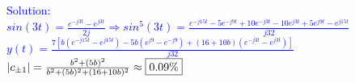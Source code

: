 \documentclass[12pt,a4paper]{article}
\begin{document}
\begin{tcolorbox}
\normalsize
\textcolor{blue}{Solution:\\
$sin(3t)=\frac{e^{-j3t}-e^{j3t}}{2j}\Rightarrow sin^5(3t)=\frac{e^{-j15t}-5e^{-j9t}+10e^{-j3t}-10e^{j3t}+5e^{j9t}-e^{j15t}}{j32}$\\
$y(t)=\frac{7[b(e^{-j15t}-e^{j15t})-5b(e^{j9}-e^{-j9})+(16+10b)(e^{-j3t}-e^{j3t})]}{j32}$\\
$|c_{\pm 1}|=\frac{b^2+(5b)^2}{b^2+(5b)^2+(16+10b)^2}\approx \fbox{0.09\%}$
}
\end{tcolorbox}

\end{document}
